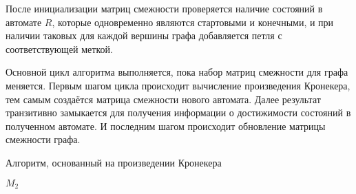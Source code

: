 После инициализации матриц смежности проверяется наличие состояний в автомате $R$, которые одновременно являются стартовыми и конечными, и при наличии таковых для каждой вершины графа добавляется петля с соответствующей меткой.

Основной цикл алгоритма выполняется, пока набор матриц смежности для графа меняется. Первым шагом цикла происходит вычисление произведения Кронекера, тем самым создаётся матрица смежности нового автомата. Далее результат транзитивно замыкается для получения информации о достижимости состояний в полученном автомате. И последним шагом происходит обновление матрицы смежности графа.

\begin{algorithm}[]
    \small
    \begin{algorithmic}[1]
    \caption{Алгоритм, основанный на произведении Кронекера}
    \label{alg:ap_tensor}
         
        
                \EndFor
            \EndFor
        \EndFor
         
             
                    \EndFor
                \EndIf
            \EndFor
        \EndWhile
    \State \Return $M_2$
    \EndFunction
    
     
        \State {}
    \EndFunction
     
        \State {}
    \EndFunction
    \end{algorithmic}
\end{algorithm}

